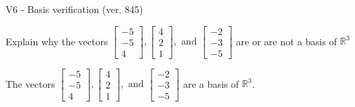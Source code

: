 \begin{exercise}
  \begin{exerciseTitle}V6 - Basis verification (ver. 845)\end{exerciseTitle}
  \begin{exerciseStatement}
    Explain why the vectors \(\left[\begin{array}{r}
-5 \\
-5 \\
4
\end{array}\right] , \left[\begin{array}{r}
4 \\
2 \\
1
\end{array}\right] , \text{ and } \left[\begin{array}{r}
-2 \\
-3 \\
-5
\end{array}\right]\) are or are not a basis of \(\mathbb{R}^3\)	


  \end{exerciseStatement}
  \begin{exerciseAnswer}
   The vectors \(\left[\begin{array}{r}
-5 \\
-5 \\
4
\end{array}\right] , \left[\begin{array}{r}
4 \\
2 \\
1
\end{array}\right] , \text{ and } \left[\begin{array}{r}
-2 \\
-3 \\
-5
\end{array}\right]\) 
  	 are  a basis of \(\mathbb{R}^3\).
  


  \end{exerciseAnswer}
\end{exercise}